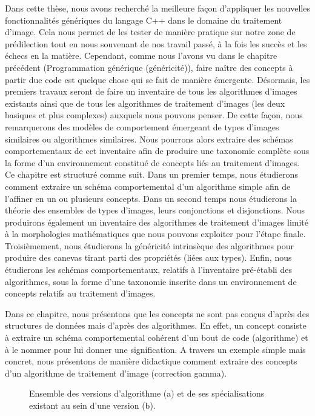 Dans cette thèse, nous avons recherché la meilleure façon d'appliquer les nouvelles fonctionnalités génériques du
langage C++ dans le domaine du traitement d'image. Cela nous permet de les tester de manière pratique sur notre zone de
prédilection tout en nous souvenant de nos travail passé, à la fois les succès et les échecs en la matière. Cependant,
comme nous l'avons vu dans le chapitre précédent (Programmation générique (généricité)), faire naître des concepts à
partir due code est quelque chose qui se fait de manière émergente. Désormais, les premiers travaux seront de faire un
inventaire de tous les algorithmes d'images existants ainsi que de tous les algorithmes de traitement d'images (les deux
basiques et plus complexes) auxquels nous pouvons penser. De cette façon, nous remarquerons des modèles de comportement
émergeant de types d'images similaires ou algorithmes similaires. Nous pourrons alors extraire des schémas
comportementaux de cet inventaire afin de produire une taxonomie complète sous la forme d'un environnement constitué de
concepts liés au traitement d'images. Ce chapitre est structuré comme suit. Dans un premier temps, nous étudierons
comment extraire un schéma comportemental d'un algorithme simple afin de l'affiner en un ou plusieurs concepts. Dans un
second temps nous étudierons la théorie des ensembles de types d'images, leurs conjonctions et disjonctions. Nous
produirons également un inventaire des algorithmes de traitement d'images limité à la morphologies mathématiques que
nous pouvons exploiter pour l'étape finale. Troisièmement, nous étudierons la généricité intrinsèque des algorithmes
pour produire des canevas tirant parti des propriétés (liées aux types). Enfin, nous étudierons les schémas
comportementaux, relatifs à l'inventaire pré-établi des algorithmes, sous la forme d'une taxonomie inscrite dans un
environnement de concepts relatifs au traitement d'images.

Dans ce chapitre, nous présentons que les concepts ne sont pas conçus d'après des structures de données mais d'après des
algorithmes. En effet, un concept consiste à extraire un schéma comportemental cohérent d'un bout de code (algorithme)
et à le nommer pour lui donner une signification. A travers un exemple simple mais concret, nous présentons de manière
didactique comment extraire des concepts d'un algorithme de traitement d'image (correction gamma).

\begin{figure}[htbp]
  \centering
  \hfil
  \caption[]{Ensemble des versions d'algorithme (a) et de ses spécialisations existant au sein d'une version (b).}
  \label{resume:fig:image.version.vs.specialization}
\end{figure}

